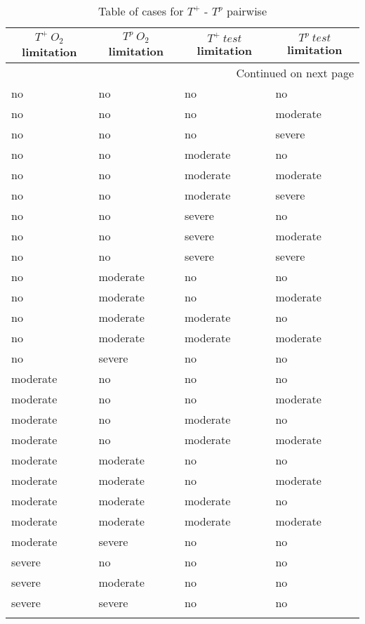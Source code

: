 \begin{longtable}[c]{|l|l|l|l|}

  \hline  \multicolumn{1}{|c|}{\textbf{$T^+\ O_2$ limitation}} & \multicolumn{1}{c|}{\textbf{$T^p\ O_2$ limitation}} & \multicolumn{1}{c|}{\textbf{$T^+\ test$ limitation}} & \multicolumn{1}{c|}{\textbf{$T^p\ test$ limitation}}  \\ \hline
  \endhead

  \hline \multicolumn{4}{|r|}{{Continued on next page}} \\ \hline
  \endfoot

  \endlastfoot
  no & no & no & no \\ \hline
  no & no & no & moderate \\ \hline
  no & no & no & severe \\ \hline
  no & no & moderate & no \\ \hline
  no & no & moderate & moderate \\ \hline
  no & no & moderate & severe \\ \hline
  no & no & severe & no \\ \hline
  no & no & severe & moderate \\ \hline
  no & no & severe & severe \\ \hline
  no & moderate & no & no \\ \hline
  no & moderate & no & moderate \\ \hline
  no & moderate & moderate & no \\ \hline
  no & moderate & moderate & moderate \\ \hline
  no & severe & no & no \\ \hline
  moderate & no & no & no \\ \hline
  moderate & no & no & moderate \\ \hline
  moderate & no & moderate & no \\ \hline
  moderate & no & moderate & moderate \\ \hline
  moderate & moderate & no & no \\ \hline
  moderate & moderate & no & moderate \\ \hline
  moderate & moderate & moderate & no \\ \hline
  moderate & moderate & moderate & moderate \\ \hline
  moderate & severe & no & no \\ \hline
  severe & no & no & no \\ \hline
  severe & moderate & no & no \\ \hline
  severe & severe & no & no \\ \hline
  \caption{Table of cases for $T^+$ - $T^p$ pairwise}
  \label{tab_Tpro-Tneg_cases}

\end{longtable}

